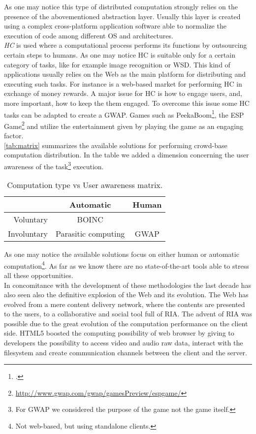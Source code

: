 As one may notice this type of distributed computation strongly relies on the
presence of the abovementioned abstraction layer. Usually this layer is
created using a complex cross-platform application software able to normalize
the execution of code among different OS and architectures.\\


\emph{\acl{HC}} is used  where a computational process performs its
functions by outsourcing certain steps to humans. As one may notice \ac{HC}
is suitable only for a certain category of tasks, like for example image
recognition or \acl{WSD}. This kind of applications usually relies on the Web
as the main platform for distributing and executing such tasks. For instance
 is a web-based market for performing \ac{HC} in exchange of
money rewards.
A major issue for \ac{HC} is how to engage users, and, more important, how to keep
the them engaged. To overcome this issue some \ac{HC} tasks can be adapted to create
a \ac{GWAP}. Games such as PeekaBoom\footcite{von2006peekaboom}, the
ESP Game\footnote{\url{http://www.gwap.com/gwap/gamesPreview/espgame/}} and
 utilize the entertainment given by playing the game as an
engaging factor.\\



\autoref{tab:matrix} summarizes the available solutions for performing crowd-base
computation distribution. In the table we added a dimension concerning the user
awareness of the task\footnote{For \ac{GWAP} we considered the purpose of the
game not the game itself.} execution.
\begin{table}[htb]
	\caption{Computation type vs User awareness matrix.}
	\label{tab:matrix}
	\centering
	\begin{tabular}{r|c|c}
		 & \textbf{Automatic} & \textbf{Human}\\
		\hline
		Voluntary & \acs{BOINC} & \citetitle{turk}\\
		\hline
		Involuntary & Parasitic computing & \acs{GWAP}
	\end{tabular}
\end{table}
As one may notice the available solutions focus on either human or automatic
computation\footnote{Not web-based, but using standalone clients.}. As far as we
know there are no state-of-the-art tools able to stress all these opportunities.\\

In concomitance with the development of these methodologies the last decade has also
seen also the definitive explosion of the Web and its evolution.
The Web has evolved from a mere content delivery network, where the contents are
presented to the users, to a collaborative and social tool full of \ac{RIA}. The
advent of \ac{RIA} was possible due to the great evolution of the computation
performance on the client side. \acs{HTML}5 boosted the computing possibility of web
browser by giving to developers the possibility to access video and audio raw data,
interact with the filesystem and create communication channels between the client
and the server.\\


